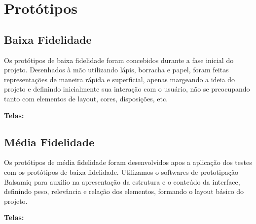 \chapter[Protótipos]{Protótipos}

\section{Baixa Fidelidade}

Os protótipos de baixa fidelidade foram concebidos durante a fase inicial do projeto. Desenhados à mão utilizando lápis, borracha e papel, foram feitas representações de maneira rápida e superficial, apenas margeando a ideia do projeto e definindo inicialmente sua interação com o usuário, não se preocupando tanto com elementos de layout, cores, disposições, etc.

\textbf{Telas:}

\section{Média Fidelidade}

Os protótipos de média fidelidade foram desenvolvidos apos a aplicação dos testes com os protótipos de baixa fidelidade. Utilizamos o softwares de prototipação Balsamiq para auxilio na apresentação da estrutura e o conteúdo da interface, definindo peso, relevância e relação dos elementos, formando o layout básico do projeto.

\textbf{Telas:}

\begin{figure}[H]
\end{figure}

